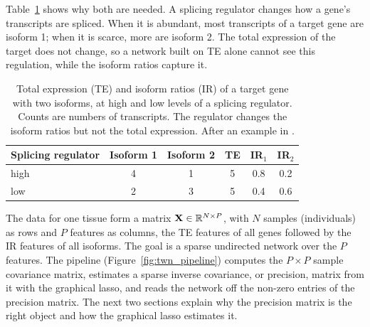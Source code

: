Table~\ref{tab:te_ir} shows why both are needed. A splicing regulator changes how a gene's transcripts are spliced. When it is abundant, most transcripts of a target gene are isoform 1; when it is scarce, more are isoform 2. The total expression of the target does not change, so a network built on TE alone cannot see this regulation, while the isoform ratios capture it.

\begin{table}[tbp]
  \centering
  \caption{Total expression (TE) and isoform ratios (IR) of a target gene with two isoforms, at high and low levels of a splicing regulator. Counts are numbers of transcripts. The regulator changes the isoform ratios but not the total expression. After an example in \citet{saha2017}.}
  \label{tab:te_ir}
  \begin{tabular}{lccccc}
    \toprule
    Splicing regulator & Isoform 1 & Isoform 2 & TE & IR$_1$ & IR$_2$ \\
    \midrule
    high & 4 & 1 & 5 & 0.8 & 0.2 \\
    low  & 2 & 3 & 5 & 0.4 & 0.6 \\
    \bottomrule
  \end{tabular}
\end{table}

The data for one tissue form a matrix $\mathbf{X}\in\mathbb{R}^{N\times P}$, with $N$ samples (individuals) as rows and $P$ features as columns, the TE features of all genes followed by the IR features of all isoforms. The goal is a sparse undirected network over the $P$ features. The pipeline (Figure~\ref{fig:twn_pipeline}) computes the $P\times P$ sample covariance matrix, estimates a sparse inverse covariance, or precision, matrix from it with the graphical lasso, and reads the network off the non-zero entries of the precision matrix. The next two sections explain why the precision matrix is the right object and how the graphical lasso estimates it.

